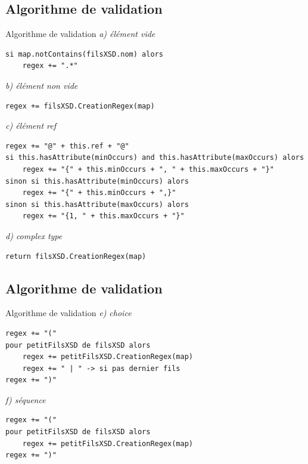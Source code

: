 \documentclass[aspectratio=169]{beamer}
\begin{document}
\subsection{Algorithme de  validation}
\begin{frame}[fragile]{Algorithme de validation}
	\textit{a) élément vide}
	\scriptsize
	\begin{verbatim}
si map.notContains(filsXSD.nom) alors
    regex += ".*"
	\end{verbatim}
	\normalsize
	\textit{b) élément non vide}
	\scriptsize
	\begin{verbatim}
regex += filsXSD.CreationRegex(map)
	\end{verbatim}
	\normalsize
	\textit{c) élément ref}
	\scriptsize
	\begin{verbatim}
regex += "@" + this.ref + "@"
si this.hasAttribute(minOccurs) and this.hasAttribute(maxOccurs) alors
    regex += "{" + this.minOccurs + ", " + this.maxOccurs + "}"
sinon si this.hasAttribute(minOccurs) alors
    regex += "{" + this.minOccurs + ",}"
sinon si this.hasAttribute(maxOccurs) alors
    regex += "{1, " + this.maxOccurs + "}"
	\end{verbatim}
	\normalsize 
	\textit{d) complex type}
	\scriptsize
	\begin{verbatim}
return filsXSD.CreationRegex(map)
	\end{verbatim}
\end{frame}

\subsection{Algorithme de  validation}
\begin{frame}[fragile]{Algorithme de validation}
	\textit{e) choice}
	\scriptsize
	\begin{verbatim}
regex += "("
pour petitFilsXSD de filsXSD alors
    regex += petitFilsXSD.CreationRegex(map)
    regex += " | " -> si pas dernier fils
regex += ")"
	\end{verbatim}
	\normalsize
	\textit{f) séquence}
	\scriptsize
	\begin{verbatim}
regex += "("
pour petitFilsXSD de filsXSD alors
    regex += petitFilsXSD.CreationRegex(map)
regex += ")"
	\end{verbatim}
\end{frame}
\end{document}
